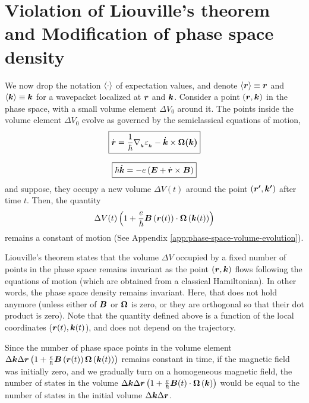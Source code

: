\documentclass{report}
\renewcommand\vec[1]{\ensuremath\boldsymbol{#1}} %
\begin{document}
\section{Violation of Liouville's theorem and Modification of phase space density}
We now drop the notation $\expval{\cdot}$ of expectation values, and denote $\expval{\vec{r}} \equiv \vec{r}$ and $\expval{\vec{k}} \equiv \vec{k}$ for a wavepacket localized at $\vec{r}$ and $\vec{k}$. Consider a point $\left(\vec{r},\vec{k}\right)$ in the phase space, with a small volume element $\Delta V_0$ around it. The points inside the volume element $\Delta V_0$ evolve as governed by the semiclassical equations of motion,
\begin{equation}\label{Eq:evolution-of-R}
	\boxed{\dot{\vec{r}} = \frac{1}{\hbar} \nabla{_{_{\vec{k}}}} \varepsilon_{_{\vec{k}}} - \dot{\vec{k}} \times \vec{\Omega(\vec{k})}}
\end{equation}

\begin{equation}\label{Eq:evolution-of-K}
	\boxed{\hbar \dot{\vec{k}} = -e\left(\vec{E} + \dot{\vec{r}} \times \vec{B} \right)}
\end{equation}
and suppose, they occupy a new volume $\Delta V(t)$ around the point $\left(\vec{r'},\vec{k'}\right)$ after time $t$. Then, the quantity $$\Delta V(t) \left(1 + \frac{e}{\hbar} \vec{B}\left(\vec{r}(t)\right) \cdot  \vec{\Omega}\left(\vec{k}(t)\right)\right)$$ remains a constant of motion (See Appendix \ref{app:phase-space-volume-evolution}).

Liouville's theorem states that the volume $\Delta V$ occupied by a fixed number of points in the phase space remains invariant as the point $\left(\vec{r},\vec{k}\right)$ flows following the equations of motion (which are obtained from a classical Hamiltonian). In other words, the phase space density remains invariant. Here, that does not hold anymore (unless either of $\vec{B}$ or $\vec{\Omega}$ is zero, or they are orthogonal so that their dot product is zero). Note that the quantity defined above is a function of the local coordinates ($\vec{r}(t), \vec{k}(t)$), and does not depend on the trajectory.

Since the number of phase space points in the volume element $\Delta \vec{k} \Delta \vec{r} \left(1 + \frac{e}{\hbar} \vec{B}\left(\vec{r}(t)\right) \vec{\Omega}\left(\vec{k}(t)\right)\right)$ remains constant in time, if the magnetic field was initially zero, and we gradually turn on a homogeneous magnetic field, the number of states in the volume $\Delta \vec{k} \Delta \vec{r} \left(1 + \frac{e}{\hbar} \vec{B}(t) \cdot \vec{\Omega}\left(\vec{k}\right)\right)$ would be equal to the number of states in the initial volume $\Delta \vec{k} \Delta \vec{r}$.
\end{document}
